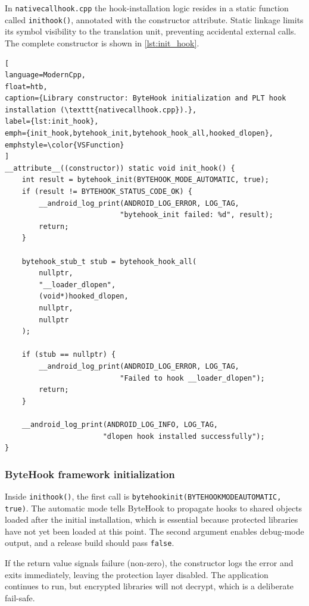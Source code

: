 \documentclass[11pt,a4paper]{report}
\renewcommand\_{{\textunderscore\allowbreak}}
\begin{document}
In \texttt{nativecallhook.cpp} the hook-installation logic resides in a static function called \texttt{init\_hook()}, annotated with the constructor attribute. Static linkage limits its symbol visibility to the translation unit, preventing accidental external calls.  The complete constructor is shown in \cref{lst:init_hook}.

\begin{lstlisting}[
language=ModernCpp,
float=htb,
caption={Library constructor: ByteHook initialization and PLT hook installation (\texttt{nativecallhook.cpp}).},
label={lst:init_hook},
emph={init_hook,bytehook_init,bytehook_hook_all,hooked_dlopen},
emphstyle=\color{VSFunction}
]
__attribute__((constructor)) static void init_hook() {
    int result = bytehook_init(BYTEHOOK_MODE_AUTOMATIC, true);
    if (result != BYTEHOOK_STATUS_CODE_OK) {
        __android_log_print(ANDROID_LOG_ERROR, LOG_TAG,
                           "bytehook_init failed: %d", result);
        return;
    }

    bytehook_stub_t stub = bytehook_hook_all(
        nullptr,
        "__loader_dlopen",
        (void*)hooked_dlopen,
        nullptr,
        nullptr
    );

    if (stub == nullptr) {
        __android_log_print(ANDROID_LOG_ERROR, LOG_TAG,
                           "Failed to hook __loader_dlopen");
        return;
    }

    __android_log_print(ANDROID_LOG_INFO, LOG_TAG,
                       "dlopen hook installed successfully");
}
\end{lstlisting}

\subsubsection{ByteHook framework initialization}

Inside \texttt{init\_hook()}, the first call is \texttt{bytehook\_init(BYTEHOOK\_MODE\_AUTOMATIC, true)}.  The automatic mode tells ByteHook to propagate hooks to shared objects loaded after the initial installation, which is essential because protected libraries have not yet been loaded at this point.  The second argument enables debug-mode output, and a release build should pass \texttt{false}.

If the return value signals failure (non-zero), the constructor logs the error and exits immediately, leaving the protection layer disabled.  The application continues to run, but encrypted libraries will not decrypt, which is a deliberate fail-safe.
\end{document}
